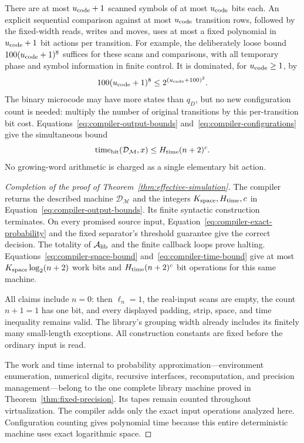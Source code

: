 There are at most ${u_{\rm code}}+1$ scanned symbols of at most ${u_{\rm code}}$ bits each.
An explicit sequential comparison against at most ${u_{\rm code}}$ transition rows,
followed by the fixed-width reads, writes and moves, uses at most a
fixed polynomial in ${u_{\rm code}}+1$ bit actions per transition.  For example,
the deliberately loose bound $100({u_{\rm code}}+1)^8$ suffices for these scans
and comparisons, with all temporary phase and symbol information in
finite control.  It is dominated, for ${u_{\rm code}}\ge1$, by
\[
 100({u_{\rm code}}+1)^8\le2^{({u_{\rm code}}+100)^2}.
\]
The binary microcode may have more states than $q_D$, but no new
configuration count is needed: multiply the number of original
transitions by this per-transition bit cost.  Equations~\eqref{eq:compiler-output-bounds}
and~\eqref{eq:compiler-configurations} give the simultaneous bound
\begin{equation}\label{eq:compiler-time-bound}
 \operatorname{time}_{\mathrm{bit}}({\mathcal D_{\mathcal M}},x)
 \le {H_{\rm time}}(n+2)^c.
\end{equation}
No growing-word arithmetic is charged as a single elementary bit action.

\begin{proof}[Completion of the proof of Theorem~\ref{thm:effective-simulation}]
The compiler returns the described machine ${\mathcal D_{\mathcal M}}$ and the integers
${K_{\rm space}},{H_{\rm time}},c$ in Equation~\eqref{eq:compiler-output-bounds}.  Its finite
syntactic construction terminates.  On every promised source input,
Equation~\eqref{eq:compiler-exact-probability} and the fixed separator's
threshold guarantee give the correct decision.  The totality of ${\mathcal A_{\rm lib}}$
and the finite callback loops prove halting.  Equations~\eqref{eq:compiler-space-bound}
and~\eqref{eq:compiler-time-bound} give at most ${K_{\rm space}}\log_2(n+2)$
work bits and ${H_{\rm time}}(n+2)^c$ bit operations for this same machine.

All claims include $n=0$: then $\ell_n=1$, the real-input scans are empty,
the count $n+1=1$ has one bit, and every displayed padding, strip,
space, and time inequality remains valid.  The library's grouping
width already includes its finitely many small-length exceptions.
All construction constants are fixed before the ordinary input is read.

The work and time internal to probability approximation---environment
enumeration, numerical digits, recursive interfaces, recomputation,
and precision management---belong to the one complete library machine
proved in Theorem~\ref{thm:fixed-precision}.  Its tapes remain counted
throughout virtualization.  The compiler adds only the exact input
operations analyzed here.  Configuration counting gives polynomial time because this
entire deterministic machine uses exact logarithmic space.
\end{proof}
